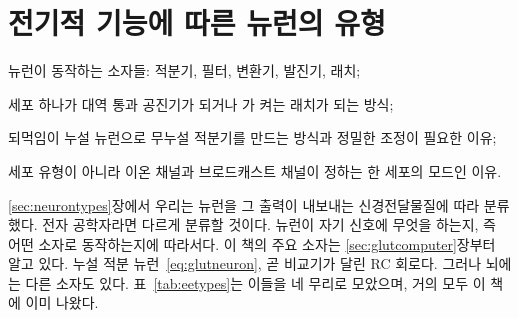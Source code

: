 \chapter{전기적 기능에 따른 뉴런의 유형}
\label{sec:eetypes}
\begin{chaptergoals}
\item 뉴런이 동작하는 소자들: 적분기, 필터, 변환기, 발진기, 래치;
\item 세포 하나가 대역 통과 공진기가 되거나 가 켜는 래치가 되는 방식;
\item 되먹임이 누설 뉴런으로 무누설 적분기를 만드는 방식과 정밀한 조정이 필요한 이유;
\item 세포 유형이 아니라 이온 채널과 브로드캐스트 채널이 정하는 한 세포의 모드인 이유.
\end{chaptergoals}

\ref{sec:neurontypes}장에서 우리는 뉴런을 그 출력이 내보내는 신경전달물질에 따라 분류했다. 전자 공학자라면 다르게 분류할 것이다. 뉴런이 자기 신호에 무엇을 하는지, 즉 어떤 소자로 동작하는지에 따라서다. 이 책의 주요 소자는 \ref{sec:glutcomputer}장부터 알고 있다. 누설 적분 뉴런~\eqref{eq:glutneuron}, 곧 비교기가 달린 RC 회로다. 그러나 뇌에는 다른 소자도 있다. 표~\ref{tab:eetypes}는 이들을 네 무리로 모았으며, 거의 모두 이 책에 이미 나왔다.

